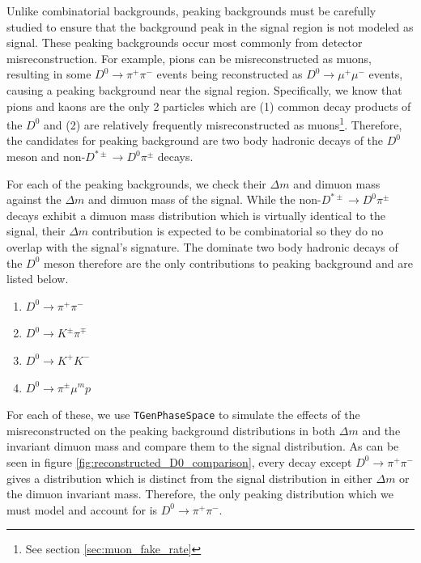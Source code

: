 Unlike combinatorial backgrounds, peaking backgrounds must be carefully studied to ensure that the background peak in the signal region is not modeled as signal. These peaking backgrounds occur most commonly from detector misreconstruction. For example, pions can be misreconstructed as muons, resulting in some $D^0 \to \pi^+ \pi^-$ events being reconstructed as $D^0 \to \mu^+ \mu^-$ events, causing a peaking background near the signal region. Specifically, we know that pions and kaons are the only 2 particles which are (1) common decay products of the $D^0$ and (2) are relatively frequently misreconstructed as muons\footnote{See section \ref{sec:muon_fake_rate}}. Therefore, the candidates for peaking background are two body hadronic decays of the $D^0$ meson and non-$D^{*\pm} \to D^0 \pi^\pm$ decays. 

For each of the peaking backgrounds, we check their $\Delta m$ and dimuon mass against the $\Delta m$ and dimuon mass of the signal. While the non-$D^{*\pm} \to D^0 \pi^\pm$ decays exhibit a dimuon mass distribution which is virtually identical to the signal, their $\Delta m$ contribution is expected to be combinatorial so they do no overlap with the signal's signature. The dominate two body hadronic decays of the $D^0$ meson therefore are the only contributions to peaking background and are listed below.
\begin{enumerate}
    \item $D^0 \to \pi^+ \pi^-$
    \item $D^0 \to K^\pm \pi^\mp$
    \item $D^0 \to K^+ K^-$
    \item $D^0 \to \pi^\pm \mu^mp$
\end{enumerate}
For each of these, we use \texttt{TGenPhaseSpace} to simulate the effects of the misreconstructed on the peaking background distributions in both $\Delta m$ and the invariant dimuon mass and compare them to the signal distribution. As can be seen in figure \ref{fig:reconstructed_D0_comparison}, every decay except $D^0 \to \pi^+ \pi^-$ gives a distribution which is distinct from the signal distribution in either $\Delta m$ or the dimuon invariant mass. Therefore, the only peaking distribution which we must model and account for is $D^0 \to \pi^+ \pi^-$. 

